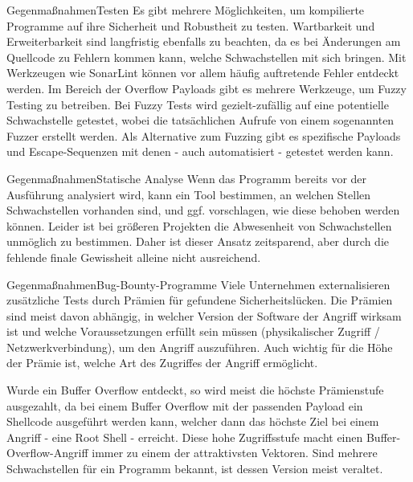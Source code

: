 \begin{frame}{Gegenmaßnahmen}{Testen}
    Es gibt mehrere Möglichkeiten, um kompilierte Programme auf ihre Sicherheit
    und Robustheit zu testen. Wartbarkeit und Erweiterbarkeit
    sind langfristig ebenfalls zu beachten, da es bei Änderungen am Quellcode
    zu Fehlern kommen kann, welche Schwachstellen mit sich bringen.
    Mit Werkzeugen wie SonarLint können vor allem häufig auftretende Fehler entdeckt
    werden.
    Im Bereich der Overflow Payloads gibt es mehrere Werkzeuge, um Fuzzy Testing
    zu betreiben. Bei Fuzzy Tests wird gezielt-zufällig auf eine
    potentielle Schwachstelle getestet, wobei die tatsächlichen Aufrufe
    von einem sogenannten Fuzzer erstellt werden.
    Als Alternative zum Fuzzing gibt es spezifische Payloads und
    Escape-Sequenzen mit denen - auch automatisiert - getestet werden kann.
    
\end{frame}


\begin{frame}{Gegenmaßnahmen}{Statische Analyse}
    Wenn das Programm bereits vor der Ausführung analysiert wird, kann ein
    Tool bestimmen, an welchen Stellen Schwachstellen vorhanden sind, und
    ggf. vorschlagen, wie diese behoben werden können. Leider ist bei größeren
    Projekten die Abwesenheit von Schwachstellen unmöglich zu bestimmen. 
    Daher ist dieser Ansatz zeitsparend, aber durch die fehlende finale Gewissheit alleine nicht ausreichend.
    
    
\end{frame}


\begin{frame}{Gegenmaßnahmen}{Bug-Bounty-Programme} 
    Viele Unternehmen externalisieren zusätzliche Tests durch Prämien für gefundene Sicherheitslücken.
    Die Prämien sind meist davon abhängig, in welcher Version der Software der Angriff 
    wirksam ist und welche Voraussetzungen erfüllt sein müssen (physikalischer Zugriff / Netzwerkverbindung),
    um den Angriff auszuführen. Auch wichtig für die Höhe der Prämie ist, welche Art des Zugriffes
    der Angriff ermöglicht.
    
    Wurde ein Buffer Overflow entdeckt, so wird meist die höchste Prämienstufe ausgezahlt, da bei einem
    Buffer Overflow mit der passenden Payload ein Shellcode ausgeführt werden kann, welcher dann das
    höchste Ziel bei einem Angriff - eine Root Shell - erreicht.
    Diese hohe Zugriffsstufe macht einen Buffer-Overflow-Angriff immer zu einem der attraktivsten Vektoren. 
    Sind mehrere Schwachstellen für ein Programm bekannt, ist dessen Version meist veraltet. 
    
    
\end{frame}


